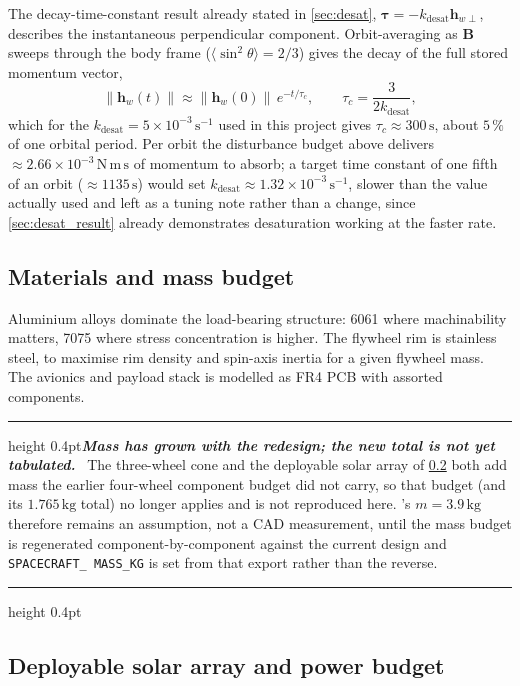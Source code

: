 \documentclass[conference,10pt,a4paper]{IEEEtran}
\newcommand{\remarkrule}{\par\nobreak\vspace{2pt}%
  \hrule height 0.4pt\vspace{4pt}\nobreak}
\newenvironment{cautionbox}[1][Caveat]
  {\par\medskip\remarkrule\noindent\small\textbf{\textit{#1.}}\ \ignorespaces}
  {\par\vspace{3pt}\hrule height 0.4pt\par\medskip\ignorespacesafterend}
\newcommand{\vect}[1]{\bm{#1}}
\newcommand{\unit}[1]{\ensuremath{\,\mathrm{#1}}}
\begin{document}
The decay-time-constant result already stated in \cref{sec:desat},
$\vect{\tau}=-k_\text{desat}\vect{h}_{w\perp}$, describes the instantaneous
perpendicular component. Orbit-averaging as $\vect{B}$ sweeps through the body
frame ($\langle\sin^2\theta\rangle=2/3$) gives the decay of the full stored
momentum vector,
\begin{equation}
\|\vect{h}_w(t)\| \approx \|\vect{h}_w(0)\|\,e^{-t/\tau_c},
\qquad
\tau_c = \frac{3}{2k_\text{desat}},
\label{eq:mtqtau}
\end{equation}
which for the $k_\text{desat}=5\times10^{-3}\unit{s^{-1}}$ used in this project
gives $\tau_c\approx300\unit{s}$, about $5\,\%$ of one orbital period. Per orbit
the disturbance budget above delivers $\approx2.66\times10^{-3}\unit{N\,m\,s}$
of momentum to absorb; a target time constant of one fifth of an orbit
($\approx1135\unit{s}$) would set $k_\text{desat}\approx1.32\times10^{-3}
\unit{s^{-1}}$, slower than the value actually used and left as a tuning note
rather than a change, since \cref{sec:desat_result} already demonstrates
desaturation working at the faster rate.

\subsection{Materials and mass budget}
\label{sec:cad_mass}

Aluminium alloys dominate the load-bearing structure: 6061 where machinability
matters, 7075 where stress concentration is higher. The flywheel rim is
stainless steel, to maximise rim density and spin-axis inertia for a given
flywheel mass. The avionics and payload stack is modelled as FR4 PCB with
assorted components.

\begin{cautionbox}[Mass has grown with the redesign; the new total is not yet tabulated]
The three-wheel cone and the deployable solar array of \cref{sec:cad_solar}
both add mass the earlier four-wheel component budget did not carry, so that
budget (and its $1.765\unit{kg}$ total) no longer applies and is not
reproduced here. 's $m=3.9\unit{kg}$ therefore remains an
assumption, not a CAD measurement, until the mass budget is regenerated
component-by-component against the current design and \texttt{SPACECRAFT\_
MASS\_KG} is set from that export rather than the reverse.
\end{cautionbox}

\subsection{Deployable solar array and power budget}
\label{sec:cad_solar}
\end{document}
